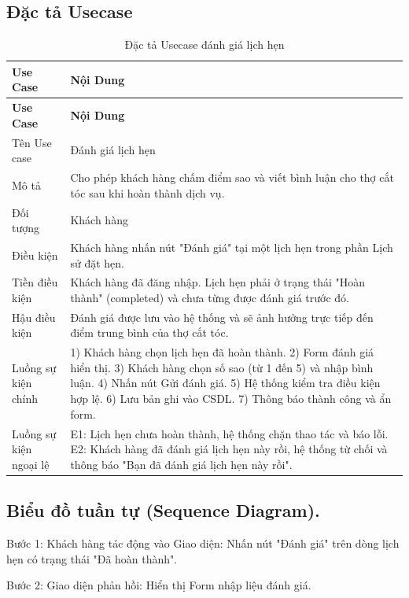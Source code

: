 \documentclass[../BTL.tex]{subfiles}
\begin{document}
\subsection{Đặc tả Usecase}
\begin{longtable}{|p{}|p{}|}
\caption{Đặc tả Usecase đánh giá lịch hẹn}\label{tab:usecase-danh-gia}\\
\hline
\textbf{Use Case} & \textbf{Nội Dung} \\
\hline
\endfirsthead
\hline
\textbf{Use Case} & \textbf{Nội Dung} \\
\hline
\endhead
Tên Use case & Đánh giá lịch hẹn \\
\hline
Mô tả & Cho phép khách hàng chấm điểm sao và viết bình luận cho thợ cắt tóc sau khi hoàn thành dịch vụ. \\
\hline
Đối tượng & Khách hàng \\
\hline
Điều kiện & Khách hàng nhấn nút "Đánh giá" tại một lịch hẹn trong phần Lịch sử đặt hẹn. \\
\hline
Tiền điều kiện & Khách hàng đã đăng nhập. Lịch hẹn phải ở trạng thái "Hoàn thành" (completed) và chưa từng được đánh giá trước đó. \\
\hline
Hậu điều kiện & Đánh giá được lưu vào hệ thống và sẽ ảnh hưởng trực tiếp đến điểm trung bình của thợ cắt tóc. \\
\hline
Luồng sự kiện chính & 1) Khách hàng chọn lịch hẹn đã hoàn thành. 2) Form đánh giá hiển thị. 3) Khách hàng chọn số sao (từ 1 đến 5) và nhập bình luận. 4) Nhấn nút Gửi đánh giá. 5) Hệ thống kiểm tra điều kiện hợp lệ. 6) Lưu bản ghi vào CSDL. 7) Thông báo thành công và ẩn form. \\
\hline
Luồng sự kiện ngoại lệ & E1: Lịch hẹn chưa hoàn thành, hệ thống chặn thao tác và báo lỗi. E2: Khách hàng đã đánh giá lịch hẹn này rồi, hệ thống từ chối và thông báo "Bạn đã đánh giá lịch hẹn này rồi". \\
\hline
\end{longtable}

\subsection{Biểu đồ tuần tự (Sequence Diagram).}

Bước 1: Khách hàng tác động vào Giao diện: Nhấn nút "Đánh giá" trên dòng lịch hẹn có trạng thái "Đã hoàn thành".

Bước 2: Giao diện phản hồi: Hiển thị Form nhập liệu đánh giá.
\end{document}
